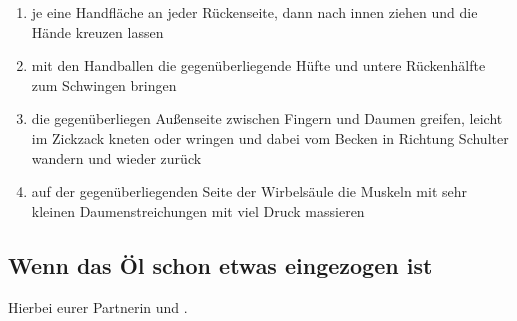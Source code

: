\begin{oframed}
  \begin{enumerate}
    \item {} je eine Handfläche an jeder Rückenseite, dann nach innen ziehen und die Hände kreuzen lassen
    \iftoggle{long}{
      \item \fett{Rücken öffnen 1:} Legt eure beiden Hände in "`Bet-Haltung"' mit den Handkanten quer zur Wirbelsäule auf die Mitte des Rückens. Geht dann zuerst mit euren Handkanten nach außen, sodass eure Handflächen nach unten zeigen. Zieht sehr langsam mit Kraft nach außen oben bis zum Nacken und unten bis zum Kreuzbein. Haltet diese Position ein paar Sekunden. Achtet darauf, dass ihr keinen Druck direkt auf die Wirbelsäule ausübt.
      \item \fett{Rücken öffnen 2:} Legt eure Unterarme quer zur Wirbelsäule auf die Mitte des Rückens. Die Bewegung ist dann dieselbe wie beim vorherigen Schritt.
    }{}
    \item {} mit den Handballen die gegenüberliegende Hüfte und untere Rückenhälfte zum Schwingen bringen
    \item {} die gegenüberliegen Außenseite zwischen Fingern und Daumen greifen, leicht im Zickzack kneten oder wringen und dabei vom Becken in Richtung Schulter wandern und wieder zurück
    \item {} auf der gegenüberliegenden Seite der Wirbelsäule die Muskeln mit sehr kleinen Daumenstreichungen mit viel Druck massieren
    \iftoggle{long}{
      \item \fett{Endlos-Streichungen auf dem Rückenstrecker mit Fingerknöcheln:} Formt Tigerkrallen mit euren Händen. Streicht dann mit dem zweiten Knöchel der Finger beider Hände den Rückenstrecker der \fett{gegenüberliegenden Rückenhälfte} von der Hüfte bis zum Kopf aus. Stützt bei Bedarf euren Zeigefinger mit dem Daumen.
    }{}
  \end{enumerate}
\end{oframed}


\pagebreak
\subsection{Wenn das Öl schon etwas eingezogen ist}

Hierbei  eurer Partnerin und .

